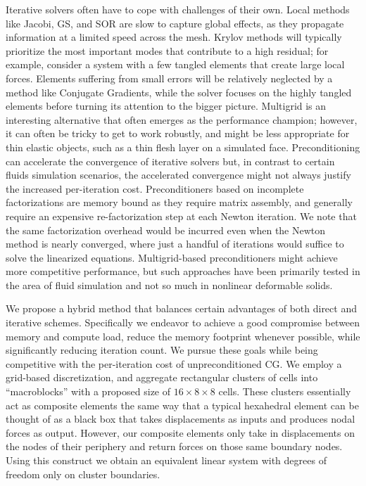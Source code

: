  Iterative solvers often have to cope with challenges of their
 own. Local methods like Jacobi, GS, and SOR are slow to capture
 global effects, as they propagate information at a limited speed
 across the mesh. Krylov methods will typically prioritize the most
 important modes that contribute to a high residual; for example,
 consider a system with a few tangled elements that create large local
 forces.  Elements suffering from small errors will be relatively
 neglected by a method like Conjugate Gradients, while the solver
 focuses on the highly tangled elements before turning its attention
 to the bigger picture. Multigrid is an interesting alternative that
 often emerges as the performance champion; however, it can often be
 tricky to get to work robustly, and might be less appropriate for
 thin elastic objects, such as a thin flesh layer on a simulated
 face. Preconditioning can accelerate the convergence of iterative
 solvers but, in contrast to certain fluids simulation scenarios, the
 accelerated convergence might not always justify the increased
 per-iteration cost. Preconditioners based on incomplete
 factorizations are memory bound as they require matrix assembly, and
 generally require an expensive re-factorization step at each Newton
 iteration. We note that the same factorization overhead would be
 incurred even when the Newton method is nearly converged, where just
 a handful of iterations would suffice to solve the linearized
 equations. Multigrid-based preconditioners might achieve more
 competitive performance, but such approaches have been primarily
 tested in the area of fluid simulation \citep{FerstWD:2014} and not so
 much in nonlinear deformable solids.

 We propose a hybrid method that balances certain advantages of both
 direct and iterative schemes. Specifically we endeavor to achieve a
 good compromise between memory and compute load, reduce the memory
 footprint whenever possible, while significantly reducing iteration
 count. We pursue these goals while being competitive with the
 per-iteration cost of unpreconditioned CG. We employ a grid-based
 discretization, and aggregate rectangular clusters of cells into
 ``macroblocks'' with a proposed size of $16\times 8\times 8$ cells.
 These clusters essentially act as composite elements the same way
 that a typical hexahedral element can be thought of as a black box
 that takes displacements as inputs and produces nodal forces as
 output. However, our composite elements only take in displacements on
 the nodes of their periphery and return forces on those same boundary
 nodes. Using this construct we obtain an equivalent linear system
 with degrees of freedom only on cluster boundaries.

